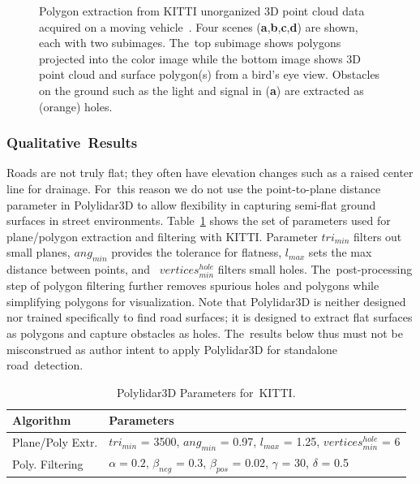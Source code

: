 \begin{figure}[ht]
  \caption[Example of Polylidar3D used with the KITTI autonomous driving dataset]{Polygon extraction from KITTI unorganized 3D point cloud data acquired on a moving vehicle~\cite{geiger_vision_2013}. Four scenes %
   (\textbf{a},\textbf{b},\textbf{c},\textbf{d}) are shown, each with two subimages. The~top subimage shows polygons projected into the color image while the bottom image shows 3D point cloud and surface polygon(s) from a bird's eye view. Obstacles on the ground such as the light and signal in (\textbf{a}) are extracted as (orange) holes. }\label{fig:ch3_kitti}
\end{figure}


\subsubsection{Qualitative~Results}\label{sec:ch3_results_kitti_qual}

Roads are not truly flat; they often have elevation changes such as a raised center line for drainage. For~this reason we do not use the point-to-plane distance parameter in Polylidar3D to allow flexibility in capturing semi-flat ground surfaces in street environments. Table~\ref{table:ch3_kitti_parameters} shows the set of parameters used for plane/polygon extraction and filtering with KITTI. Parameter $tri_{min}$ filters out small planes, $ang_{min}$ provides the tolerance for flatness, $l_{max}$ sets the max distance between points, and~ $vertices^{hole}_{min}$ filters small holes. The~post-processing step of polygon filtering further removes spurious holes and polygons while simplifying polygons for visualization. Note that Polylidar3D is neither designed nor trained specifically to find road surfaces; it is designed to extract flat surfaces as polygons and capture obstacles as holes. The~results below thus must not be misconstrued as author intent to apply Polylidar3D for standalone road~detection. 

\begin{table}[H]
\centering
\caption{Polylidar3D Parameters for~KITTI.}\label{table:ch3_kitti_parameters}
\begin{tabular}{@{}ll@{}}
\toprule
\textbf{Algorithm}        & \textbf{Parameters}                                                          \\ \midrule
Plane/Poly Extr.      & $tri_{min}$ = 3500, $ang_{min}$ = 0.97, $l_{max}$ = 1.25, $vertices^{hole}_{min}$ = 6      \\
Poly. Filtering      & $\alpha = 0.2$, $\beta_{neg}$ = 0.3, $\beta_{pos}$ = 0.02, $\gamma$ = 30, $\delta$ = 0.5      \\ \bottomrule
\end{tabular}
\end{table}


